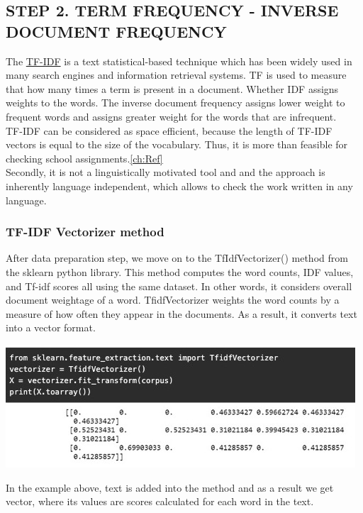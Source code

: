 \subsection*{STEP 2. TERM FREQUENCY - INVERSE DOCUMENT FREQUENCY}
The \hyperlink{tfidf}{TF-IDF} is a text statistical-based technique which has been widely used in many search engines and information retrieval systems. TF is used to measure that how many times a term is present in a document. Whether IDF assigns weights to the words. The inverse document frequency assigns lower weight to frequent words and assigns greater weight for the words that are infrequent. \cite{qaiser2018text} \\
TF-IDF can be considered as space efficient, because the length of TF-IDF vectors is equal to the size of the vocabulary. Thus, it is more than feasible for checking school assignments.\ref{ch:Ref} \\
Secondly, it is not a linguistically motivated tool and and the approach is inherently language independent, which allows to check the work written in any language.\cite{van2010automatic}\\
\subsubsection{TF-IDF Vectorizer method}
After data preparation step, we move on to the TfIdfVectorizer() method from the sklearn python library. This method computes the word counts, IDF values, and Tf-idf scores all using the same dataset. In other words, it considers overall document weightage of a word.  TfidfVectorizer weights the word counts by a measure of how often they appear in the documents. As a result, it converts text into a vector format.
\begin{center}
    \includegraphics{vector.jpeg}
\end{center}
In the example above, text is added into the method and as a result we get vector, where its values are scores calculated for each word in the text.
